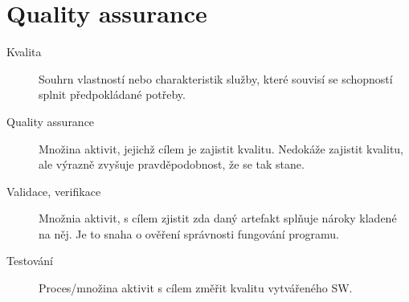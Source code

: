 \section{Quality assurance}
  \begin{description}
    \item[Kvalita] Souhrn vlastností nebo charakteristik služby, které souvisí se schopností splnit předpokládané potřeby.
    \item[Quality assurance] Množina aktivit, jejichž cílem je zajistit kvalitu. Nedokáže zajistit
    kvalitu, ale výrazně zvyšuje pravděpodobnost, že se tak stane.
    \item[Validace, verifikace] Množnia aktivit, s cílem zjistit zda daný artefakt splňuje nároky kladené na něj.
    Je to snaha o ověření správnosti fungování programu.
    \item[Testování] Proces/množina aktivit s cílem změřit kvalitu vytvářeného SW.
  \end{description}
